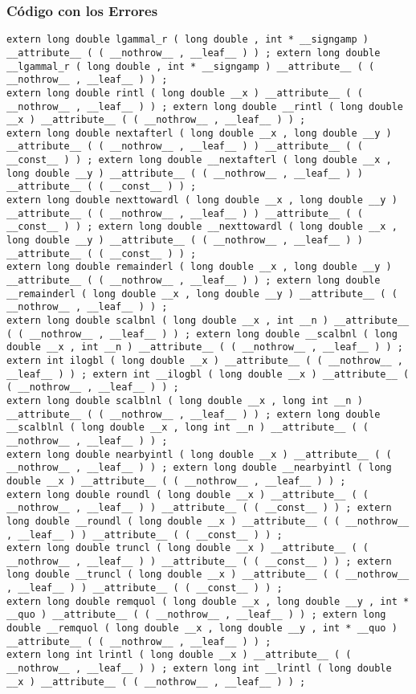 \documentclass{beamer}
\begin{document}
\begin{frame}[fragile]
\frametitle{C\'odigo con los Errores}
\begin{verbatim}
extern long double lgammal_r ( long double , int * __signgamp ) __attribute__ ( ( __nothrow__ , __leaf__ ) ) ; extern long double __lgammal_r ( long double , int * __signgamp ) __attribute__ ( ( __nothrow__ , __leaf__ ) ) ; 
extern long double rintl ( long double __x ) __attribute__ ( ( __nothrow__ , __leaf__ ) ) ; extern long double __rintl ( long double __x ) __attribute__ ( ( __nothrow__ , __leaf__ ) ) ; 
extern long double nextafterl ( long double __x , long double __y ) __attribute__ ( ( __nothrow__ , __leaf__ ) ) __attribute__ ( ( __const__ ) ) ; extern long double __nextafterl ( long double __x , long double __y ) __attribute__ ( ( __nothrow__ , __leaf__ ) ) __attribute__ ( ( __const__ ) ) ; 
extern long double nexttowardl ( long double __x , long double __y ) __attribute__ ( ( __nothrow__ , __leaf__ ) ) __attribute__ ( ( __const__ ) ) ; extern long double __nexttowardl ( long double __x , long double __y ) __attribute__ ( ( __nothrow__ , __leaf__ ) ) __attribute__ ( ( __const__ ) ) ; 
extern long double remainderl ( long double __x , long double __y ) __attribute__ ( ( __nothrow__ , __leaf__ ) ) ; extern long double __remainderl ( long double __x , long double __y ) __attribute__ ( ( __nothrow__ , __leaf__ ) ) ; 
extern long double scalbnl ( long double __x , int __n ) __attribute__ ( ( __nothrow__ , __leaf__ ) ) ; extern long double __scalbnl ( long double __x , int __n ) __attribute__ ( ( __nothrow__ , __leaf__ ) ) ; 
extern int ilogbl ( long double __x ) __attribute__ ( ( __nothrow__ , __leaf__ ) ) ; extern int __ilogbl ( long double __x ) __attribute__ ( ( __nothrow__ , __leaf__ ) ) ; 
extern long double scalblnl ( long double __x , long int __n ) __attribute__ ( ( __nothrow__ , __leaf__ ) ) ; extern long double __scalblnl ( long double __x , long int __n ) __attribute__ ( ( __nothrow__ , __leaf__ ) ) ; 
extern long double nearbyintl ( long double __x ) __attribute__ ( ( __nothrow__ , __leaf__ ) ) ; extern long double __nearbyintl ( long double __x ) __attribute__ ( ( __nothrow__ , __leaf__ ) ) ; 
extern long double roundl ( long double __x ) __attribute__ ( ( __nothrow__ , __leaf__ ) ) __attribute__ ( ( __const__ ) ) ; extern long double __roundl ( long double __x ) __attribute__ ( ( __nothrow__ , __leaf__ ) ) __attribute__ ( ( __const__ ) ) ; 
extern long double truncl ( long double __x ) __attribute__ ( ( __nothrow__ , __leaf__ ) ) __attribute__ ( ( __const__ ) ) ; extern long double __truncl ( long double __x ) __attribute__ ( ( __nothrow__ , __leaf__ ) ) __attribute__ ( ( __const__ ) ) ; 
extern long double remquol ( long double __x , long double __y , int * __quo ) __attribute__ ( ( __nothrow__ , __leaf__ ) ) ; extern long double __remquol ( long double __x , long double __y , int * __quo ) __attribute__ ( ( __nothrow__ , __leaf__ ) ) ; 
extern long int lrintl ( long double __x ) __attribute__ ( ( __nothrow__ , __leaf__ ) ) ; extern long int __lrintl ( long double __x ) __attribute__ ( ( __nothrow__ , __leaf__ ) ) ; 
\end{verbatim}
\end{frame}
\end{document}
